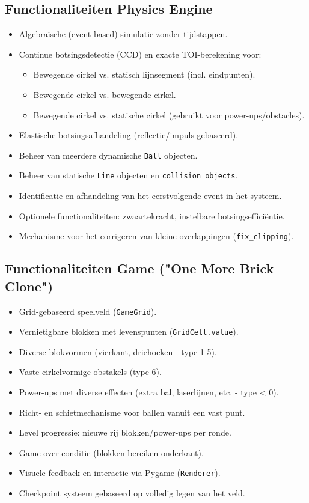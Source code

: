 \documentclass[11pt, a4paper]{article}
\begin{document}
\subsection{Functionaliteiten Physics Engine}
\begin{itemize}
    \item Algebraïsche (event-based) simulatie zonder tijdstappen.
    \item Continue botsingsdetectie (CCD) en exacte TOI-berekening voor:
        \begin{itemize}
            \item Bewegende cirkel vs. statisch lijnsegment (incl. eindpunten).
            \item Bewegende cirkel vs. bewegende cirkel.
            \item Bewegende cirkel vs. statische cirkel (gebruikt voor power-ups/obstacles).
        \end{itemize}
    \item Elastische botsingsafhandeling (reflectie/impuls-gebaseerd).
    \item Beheer van meerdere dynamische \texttt{Ball} objecten.
    \item Beheer van statische \texttt{Line} objecten en \texttt{collision\_objects}.
    \item Identificatie en afhandeling van het eerstvolgende event in het systeem.
    \item Optionele functionaliteiten: zwaartekracht, instelbare botsingsefficiëntie.
    \item Mechanisme voor het corrigeren van kleine overlappingen (\texttt{fix\_clipping}).
\end{itemize}

\subsection{Functionaliteiten Game ("One More Brick Clone")}
\begin{itemize}
    \item Grid-gebaseerd speelveld (\texttt{GameGrid}).
    \item Vernietigbare blokken met levenspunten (\texttt{GridCell.value}).
    \item Diverse blokvormen (vierkant, driehoeken - type 1-5).
    \item Vaste cirkelvormige obstakels (type 6).
    \item Power-ups met diverse effecten (extra bal, laserlijnen, etc. - type < 0).
    \item Richt- en schietmechanisme voor ballen vanuit een vast punt.
    \item Level progressie: nieuwe rij blokken/power-ups per ronde.
    \item Game over conditie (blokken bereiken onderkant).
    \item Visuele feedback en interactie via Pygame (\texttt{Renderer}).
    \item Checkpoint systeem gebaseerd op volledig legen van het veld.
\end{itemize}
\end{document}
